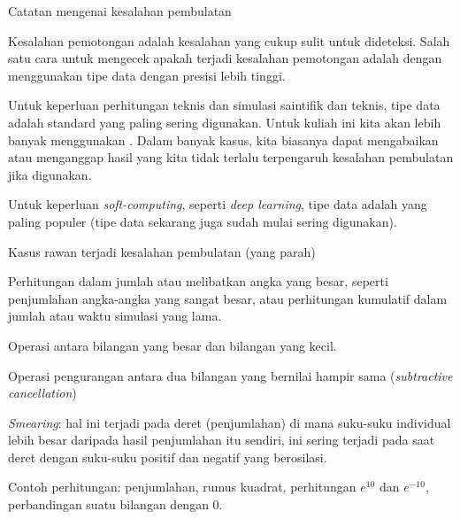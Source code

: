 \begin{frame}{Catatan mengenai kesalahan pembulatan}

Kesalahan pemotongan adalah kesalahan yang cukup sulit untuk dideteksi.
Salah satu cara untuk mengecek apakah terjadi kesalahan pemotongan adalah
dengan menggunakan tipe data dengan presisi lebih tinggi.

Untuk keperluan perhitungan teknis dan simulasi saintifik dan teknis,
tipe data  adalah standard yang paling sering digunakan.
Untuk kuliah ini kita akan lebih banyak menggunakan .
Dalam banyak kasus, kita biasanya dapat mengabaikan atau menganggap hasil
yang kita tidak terlalu terpengaruh kesalahan pembulatan jika
 digunakan.

Untuk keperluan \textit{soft-computing}, seperti \textit{deep learning},
tipe data  adalah yang paling populer (tipe data
 sekarang juga sudah mulai sering digunakan).

\end{frame}


\begin{frame}{Kasus rawan terjadi kesalahan pembulatan (yang parah)}

Perhitungan dalam jumlah atau melibatkan angka yang besar, seperti
penjumlahan angka-angka yang sangat besar, atau perhitungan kumulatif
dalam jumlah atau waktu simulasi yang lama.

Operasi antara bilangan yang besar dan bilangan yang kecil.

Operasi pengurangan antara dua bilangan yang bernilai hampir sama
(\textit{subtractive cancellation})

\textit{Smearing}: hal ini terjadi pada deret (penjumlahan) di mana
suku-suku individual lebih besar daripada hasil penjumlahan itu sendiri,
ini sering terjadi pada saat deret dengan suku-suku positif dan negatif
yang berosilasi.

Contoh perhitungan: penjumlahan, rumus kuadrat, perhitungan $e^{10}$
dan $e^{-10}$, perbandingan suatu bilangan dengan 0.

\end{frame}

